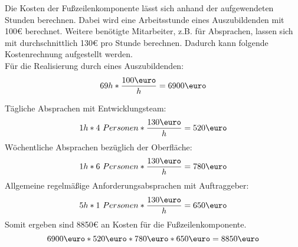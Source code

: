 Die Kosten der Fußzeilenkomponente lässt sich anhand der aufgewendeten Stunden berechnen.
Dabei wird eine Arbeitsstunde eines Auszubildenden mit 100€ berechnet. Weitere benötigte Mitarbeiter, z.B. für Absprachen, lassen sich mit durchschnittlich 130€ pro Stunde berechnen. 
Dadurch kann folgende Kostenrechnung aufgestellt werden.\\
Für die Realisierung durch eines Auszubildenden: \\
\begin{equation}
	69h * \frac{100\mbox{\euro}}{h} = 6900\mbox{\euro} \\
\end{equation}

Tägliche Absprachen mit Entwicklungsteam: \\
\begin{equation}
	1h * 4\ Personen * \frac{130\mbox{\euro}}{h} = 520\mbox{\euro} \\
\end{equation}
Wöchentliche Absprachen bezüglich der Oberfläche:  \\
\begin{equation}
	1h * 6\ Personen * \frac{130\mbox{\euro}}{h} = 780\mbox{\euro} \\
\end{equation}
Allgemeine regelmäßige Anforderungsabsprachen mit Auftraggeber:  \\
\begin{equation}
	5h * 1\ Personen * \frac{130\mbox{\euro}}{h} = 650\mbox{\euro} \\
\end{equation}
Somit ergeben sind 8850€ an Kosten für die Fußzeilenkomponente.
\begin{equation}
	6900\mbox{\euro} * 520\mbox{\euro} * 780\mbox{\euro} * 650\mbox{\euro}  =  8850\mbox{\euro}  \\
\end{equation}
